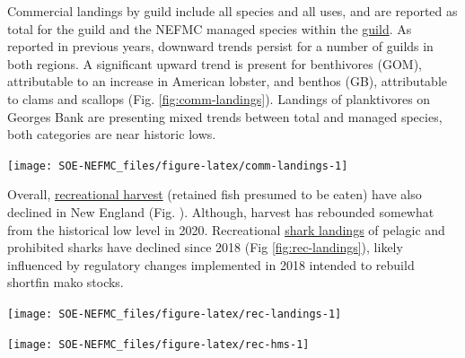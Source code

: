 \documentclass[
  10pt,
]{article}
\let\origfigure\figure
\let\endorigfigure\endfigure
\renewenvironment{figure}[1][2] {
    \expandafter\origfigure\expandafter[H]
} {
    \endorigfigure
}
\begin{document}
Commercial landings by guild include all species and all uses, and are reported as total for the guild and the NEFMC managed species within the \href{https://noaa-edab.github.io/catalog/feeding-guilds-by-management-bodies.html}{guild}. As reported in previous years, downward trends persist for a number of guilds in both regions. A significant upward trend is present for benthivores (GOM), attributable to an increase in American lobster, and benthos (GB), attributable to clams and scallops (Fig. \ref{fig:comm-landings}). Landings of planktivores on Georges Bank are presenting mixed trends between total and managed species, both categories are near historic lows.

\begin{figure}

{\centering \texttt{[image: SOE-NEFMC\_files/figure-latex/comm-landings-1]} 

}

\caption{Total commercial landings (black) and NEFMC managed U.S seafood landings (red) by feeding guild for the Gulf of Maine.}\label{fig:comm-landings}
\end{figure}

Overall, \href{https://noaa-edab.github.io/catalog/recreational-fishing-indicators.html}{recreational harvest} (retained fish presumed to be eaten) have also declined in New England (Fig. ). Although, harvest has rebounded somewhat from the historical low level in 2020. Recreational \href{https://noaa-edab.github.io/catalog/highly-migratory-species-landings.html}{shark landings} of pelagic and prohibited sharks have declined since 2018 (Fig \ref{fig:rec-landings}), likely influenced by regulatory changes implemented in 2018 intended to rebuild shortfin mako stocks.

\begin{figure}

{\centering \texttt{[image: SOE-NEFMC\_files/figure-latex/rec-landings-1]} 

}

\caption{Total recreational seafood harvest (millions of pounds) in the New England region.}\label{fig:rec-landings}
\end{figure}

\begin{figure}

{\centering \texttt{[image: SOE-NEFMC\_files/figure-latex/rec-hms-1]} 

}

\caption{Recreational shark landings from Large Pelagics Survey.}\label{fig:rec-hms}
\end{figure}
\end{document}
